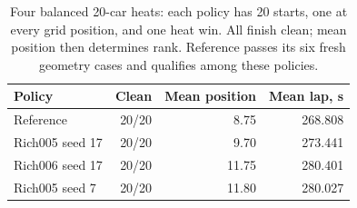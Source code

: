 \begin{table}[t]
\caption{Four balanced 20-car heats: each policy has 20 starts, one at every grid position, and one heat win. All finish clean; mean position then determines rank. Reference passes its six fresh geometry cases and qualifies among these policies.}
\label{tab:final}
\centering\small\setlength{\tabcolsep}{4pt}
\begin{tabular}{lrrr}
\toprule
Policy & Clean & Mean position & Mean lap, s\\
\midrule
Reference & 20/20 & 8.75 & 268.808\\
Rich005 seed 17 & 20/20 & 9.70 & 273.441\\
Rich006 seed 17 & 20/20 & 11.75 & 280.401\\
Rich005 seed 7 & 20/20 & 11.80 & 280.027\\
\bottomrule
\end{tabular}
\end{table}
